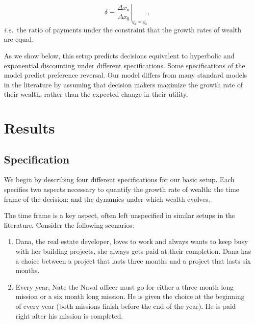 \documentclass[11pt]{article}
\newcommand{\Sref}[1]{Section~\ref{sec:#1}}
\newcommand{\ie}{{\it i.e.}\ }
\newcommand{\be}{\begin{equation}}
\newcommand{\ee}{\end{equation}}
\newcommand{\Dx}{\Delta x}
\numberwithin{equation}{section}
\begin{document}
\be
\delta \equiv \left.\frac{\Dx_a}{\Dx_b}\right|_{g_a=g_b},
\ee
\ie the ratio of payments under the constraint that the growth rates of wealth are equal.

As we show below, this setup predicts decisions equivalent to hyperbolic and exponential discounting under different specifications. Some specifications of the model predict preference reversal. Our model differs from many standard models in the literature by assuming that decision makers maximize the growth rate of their wealth, rather than the expected change in their utility.

\section{Results}\label{sec:results}

\subsection{Specification}

We begin by describing four different specifications for our basic setup. Each specifies two aspects necessary to quantify the growth rate of wealth: the time frame of the decision; and the dynamics under which wealth evolves.

The time frame is a key aspect, often left unspecified in similar setups in the literature. Consider the following scenarios:

\begin{enumerate}
    \item Dana, the real estate developer, loves to work and always wants to keep busy with her building projects, she always gets paid at their completion. Dana has a choice between a project that lasts three months and a project that lasts six months. 
    \item Every year, Nate the Naval officer must go for either a three month long mission or a six month long mission. He is given the choice at the beginning of every year (both missions finish before the end of the year). He is paid right after his mission is completed.
\end{enumerate}
\end{document}
